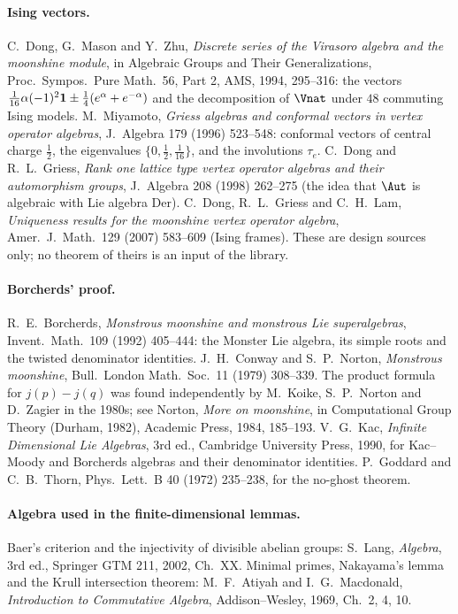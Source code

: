 \paragraph{Ising vectors.}  C.~Dong, G.~Mason and Y.~Zhu, \emph{Discrete series of the Virasoro algebra and the moonshine
module}, in Algebraic Groups and Their Generalizations, Proc.\ Sympos.\ Pure Math.\ 56, Part 2, AMS, 1994, 295--316: the
vectors $\tfrac1{16}\alpha(-1)^2\mathbf 1\pm\tfrac14(e^\alpha+e^{-\alpha})$ and the decomposition of $\Vnat$ under $48$ commuting Ising
models.  M.~Miyamoto, \emph{Griess algebras and conformal vectors in vertex operator algebras}, J.\ Algebra 179 (1996)
523--548: conformal vectors of central charge $\tfrac12$, the eigenvalues $\{0,\tfrac12,\tfrac1{16}\}$, and the involutions
$\tau_e$.  C.~Dong and R.~L.~Griess, \emph{Rank one lattice type vertex operator algebras and their automorphism groups},
J.\ Algebra 208 (1998) 262--275 (the idea that $\Aut$ is algebraic with Lie algebra $\mathrm{Der}$).  C.~Dong, R.~L.~Griess and
C.~H.~Lam, \emph{Uniqueness results for the moonshine vertex operator algebra}, Amer.\ J.\ Math.\ 129 (2007) 583--609
(Ising frames).  These are design sources only; no theorem of theirs is an input of the library.

\paragraph{Borcherds' proof.}  R.~E.~Borcherds, \emph{Monstrous moonshine and monstrous Lie superalgebras}, Invent.\ Math.\ 109
(1992) 405--444: the Monster Lie algebra, its simple roots and the twisted denominator identities.  J.~H.~Conway and
S.~P.~Norton, \emph{Monstrous moonshine}, Bull.\ London Math.\ Soc.\ 11 (1979) 308--339.  The product formula for $j(p)-j(q)$
was found independently by M.~Koike, S.~P.~Norton and D.~Zagier in the 1980s; see Norton, \emph{More on moonshine}, in
Computational Group Theory (Durham, 1982), Academic Press, 1984, 185--193.  V.~G.~Kac, \emph{Infinite Dimensional Lie
Algebras}, 3rd ed., Cambridge University Press, 1990, for Kac--Moody and Borcherds algebras and their denominator identities.
P.~Goddard and C.~B.~Thorn, Phys.\ Lett.\ B 40 (1972) 235--238, for the no-ghost theorem.

\paragraph{Algebra used in the finite-dimensional lemmas.}  Baer's criterion and the injectivity of divisible abelian groups:
S.~Lang, \emph{Algebra}, 3rd ed., Springer GTM 211, 2002, Ch.~XX.  Minimal primes, Nakayama's lemma and the Krull intersection
theorem: M.~F.~Atiyah and I.~G.~Macdonald, \emph{Introduction to Commutative Algebra}, Addison--Wesley, 1969, Ch.~2, 4, 10.

